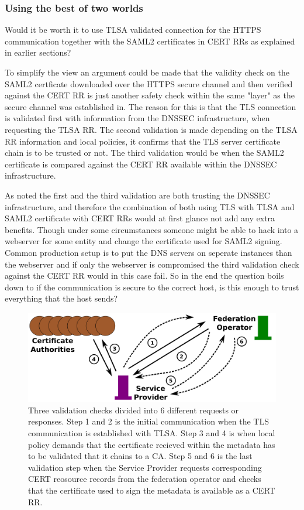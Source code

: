 \subsubsection{Using the best of two worlds}
Would it be worth it to use TLSA validated connection for the HTTPS communication together with the SAML2 certificates in CERT RRs as explained in earlier sections?

To simplify the view an argument could be made that the validity check on the SAML2 certficate downloaded over the HTTPS secure channel and then verified against the CERT RR is just another safety check within the same "layer" as the secure channel was established in.
The reason for this is that the TLS connection is validated first with information from the DNSSEC infrastructure, when requesting the TLSA RR.
The second validation is made depending on the TLSA RR information and local policies, it confirms that the TLS server certificate chain is to be trusted or not.
The third validation would be when the SAML2 certificate is compared against the CERT RR available within the DNSSEC infrastructure.

As noted the first and the third validation are both trusting the DNSSEC infrastructure, and therefore the combination of both using TLS with TLSA and SAML2 certificate with CERT RRs would at first glance not add any extra benefits.
Though under some circumstances someone might be able to hack into a webserver for some entity and change the certificate used for SAML2 signing.
Common production setup is to put the DNS servers on seperate instances than the webserver and if only the webserver is compromised the third validation check against the CERT RR would in this case fail.
So in the end the question boils down to if the communication is secure to the correct host, is this enough to trust everything that the host sends?

\begin{figure}[ht]
\begin{center}
\includegraphics[scale=1]{Figures/bestOfTwoWorlds.png}
\end{center}
\caption{Three validation checks divided into 6 different requests or responses.
Step 1 and 2 is the initial communication when the TLS communication is established with TLSA.
Step 3 and 4 is when local policy demands that the certificate recieved within the metadata has to be validated that it chains to a CA.
Step 5 and 6 is the last validation step when the Service Provider requests corresponding CERT reosource records from the federation operator and checks that the certificate used to sign the metadata is available as a CERT RR.
\label{ch4:bestOfTwoWorlds}}
\end{figure}

